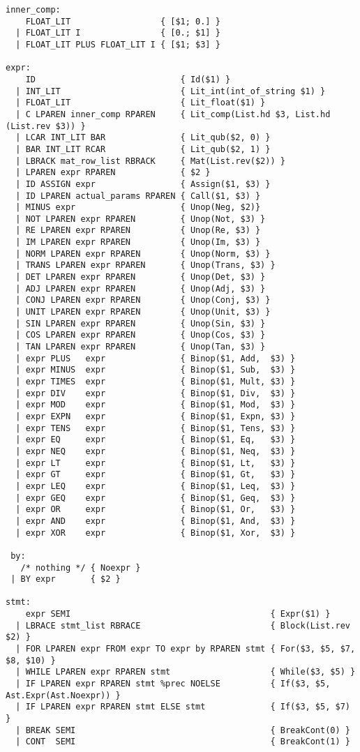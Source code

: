 \begin{lstlisting}
inner_comp:
    FLOAT_LIT                  { [$1; 0.] }
  | FLOAT_LIT I                { [0.; $1] }
  | FLOAT_LIT PLUS FLOAT_LIT I { [$1; $3] }

expr:
    ID                             { Id($1) }
  | INT_LIT                        { Lit_int(int_of_string $1) }
  | FLOAT_LIT                      { Lit_float($1) }
  | C LPAREN inner_comp RPAREN     { Lit_comp(List.hd $3, List.hd (List.rev $3)) } 
  | LCAR INT_LIT BAR               { Lit_qub($2, 0) }
  | BAR INT_LIT RCAR               { Lit_qub($2, 1) }
  | LBRACK mat_row_list RBRACK     { Mat(List.rev($2)) }
  | LPAREN expr RPAREN             { $2 }
  | ID ASSIGN expr                 { Assign($1, $3) }
  | ID LPAREN actual_params RPAREN { Call($1, $3) }
  | MINUS expr                     { Unop(Neg, $2)}
  | NOT LPAREN expr RPAREN         { Unop(Not, $3) }
  | RE LPAREN expr RPAREN          { Unop(Re, $3) }
  | IM LPAREN expr RPAREN          { Unop(Im, $3) }
  | NORM LPAREN expr RPAREN        { Unop(Norm, $3) }
  | TRANS LPAREN expr RPAREN       { Unop(Trans, $3) }
  | DET LPAREN expr RPAREN         { Unop(Det, $3) }
  | ADJ LPAREN expr RPAREN         { Unop(Adj, $3) }
  | CONJ LPAREN expr RPAREN        { Unop(Conj, $3) }
  | UNIT LPAREN expr RPAREN        { Unop(Unit, $3) }
  | SIN LPAREN expr RPAREN         { Unop(Sin, $3) }
  | COS LPAREN expr RPAREN         { Unop(Cos, $3) }
  | TAN LPAREN expr RPAREN         { Unop(Tan, $3) }
  | expr PLUS   expr               { Binop($1, Add,  $3) }
  | expr MINUS  expr               { Binop($1, Sub,  $3) }
  | expr TIMES  expr               { Binop($1, Mult, $3) }
  | expr DIV    expr               { Binop($1, Div,  $3) }
  | expr MOD    expr               { Binop($1, Mod,  $3) }
  | expr EXPN   expr               { Binop($1, Expn, $3) }
  | expr TENS   expr               { Binop($1, Tens, $3) }
  | expr EQ     expr               { Binop($1, Eq,   $3) }
  | expr NEQ    expr               { Binop($1, Neq,  $3) }
  | expr LT     expr               { Binop($1, Lt,   $3) }
  | expr GT     expr               { Binop($1, Gt,   $3) }
  | expr LEQ    expr               { Binop($1, Leq,  $3) }
  | expr GEQ    expr               { Binop($1, Geq,  $3) }
  | expr OR     expr               { Binop($1, Or,   $3) }
  | expr AND    expr               { Binop($1, And,  $3) }
  | expr XOR    expr               { Binop($1, Xor,  $3) }

 by:
   /* nothing */ { Noexpr }
 | BY expr       { $2 }

stmt:  
    expr SEMI                                        { Expr($1) }
  | LBRACE stmt_list RBRACE                          { Block(List.rev $2) }
  | FOR LPAREN expr FROM expr TO expr by RPAREN stmt { For($3, $5, $7, $8, $10) }
  | WHILE LPAREN expr RPAREN stmt                    { While($3, $5) }
  | IF LPAREN expr RPAREN stmt %prec NOELSE          { If($3, $5, Ast.Expr(Ast.Noexpr)) }
  | IF LPAREN expr RPAREN stmt ELSE stmt             { If($3, $5, $7) }
  | BREAK SEMI                                       { BreakCont(0) }
  | CONT  SEMI                                       { BreakCont(1) }


\end{lstlisting}
